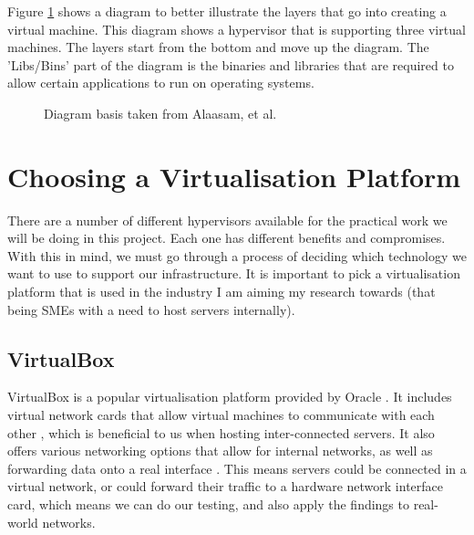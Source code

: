 Figure \ref{fig:VirtualisationDiagram} shows a diagram to better illustrate the layers that go into creating a virtual machine. This diagram shows a hypervisor that is supporting three virtual machines. The layers start from the bottom and move up the diagram. The 'Libs/Bins' part of the diagram is the binaries \citep{binlinux} and libraries \citep{liblinux} that are required to allow certain applications to run on operating systems.
\begin{figure}[H]
\caption{Diagram basis taken from Alaasam, et al. \citep{binsandlibs}}
\label{fig:VirtualisationDiagram}
\centering
\end{figure}

\section{Choosing a Virtualisation Platform}
There are a number of different hypervisors available for the practical work we will be doing in this project. Each one has different benefits and compromises. With this in mind, we must go through a process of deciding which technology we want to use to support our infrastructure. It is important to pick a virtualisation platform that is used in the industry I am aiming my research towards (that being SMEs with a need to host servers internally).

\subsection{VirtualBox}
VirtualBox is a popular virtualisation platform provided by Oracle \citep{VirtualBoxOracle}. It includes virtual network cards that allow virtual machines to communicate with each other \citep[1.3. Features Overview]{VirtualBoxManual}, which is beneficial to us when hosting inter-connected servers. It also offers various networking options that allow for internal networks, as well as forwarding data onto a real interface \citep[6.2. Introduction to Networking Modes]{VirtualBoxManual}. This means servers could be connected in a virtual network, or could forward their traffic to a hardware network interface card, which means we can do our testing, and also apply the findings to real-world networks.

